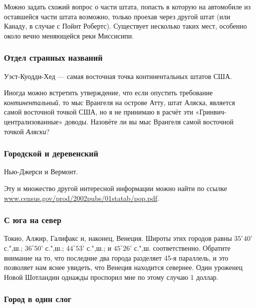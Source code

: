 \documentclass[twoside]{book}
\begin{document}
Можно задать схожий вопрос о части штата, попасть в которую на автомобиле из оставшейся части штата возможно, только проехав через другой штат (или Канаду, в случае с 
Пойнт Робертс). %
Существует несколько таких мест, особенно около вечно меняющейся реки Миссисипи.%

\subsubsection*{Отдел странных названий}%

Уэст-Куодди-Хед %
--- самая восточная точка континентальных штатов США.\heart
                            

Иногда можно встретить утверждение, что если опустить требование \emph{континентальный}, то мыс Врангеля %
на острове Атту, %
штат Аляска, является самой восточной точкой США, но я не принимаю в расчёт эти «Гринвич-централизованные» доводы.
Назовёте ли вы мыс Врангеля самой восточной точкой \emph{Аляски}?

\subsubsection*{Городской и деревенский}%

Нью-Джерси и Вермонт.

Эту и множество другой интересной информации можно найти по ссылке
\href{http//www.census.gov/prod/2002pubs/01statab/pop.pdf}{\url{www.census.gov/prod/2002pubs/01statab/pop.pdf}}.
 \heart                          

\subsubsection*{С юга на север}%

Токио, Алжир, Галифакс и, наконец, Венеция.
Широты этих городов равны
$35^\circ 40’$ с.",ш.; $36^\circ 50’$ с.",ш.; $44^\circ 53’$ с.",ш.; и $45^\circ 26’$ с.",ш. соответственно.
Обратите внимание на то, что последние два города разделяет 45-я параллель, и это позволяет нам яснее увидеть, что Венеция находится севернее.
Один уроженец Новой Шотландии однажды проспорил мне по этому случаю 1 доллар.
\heart

\subsubsection*{Город в один слог}%
\end{document}

